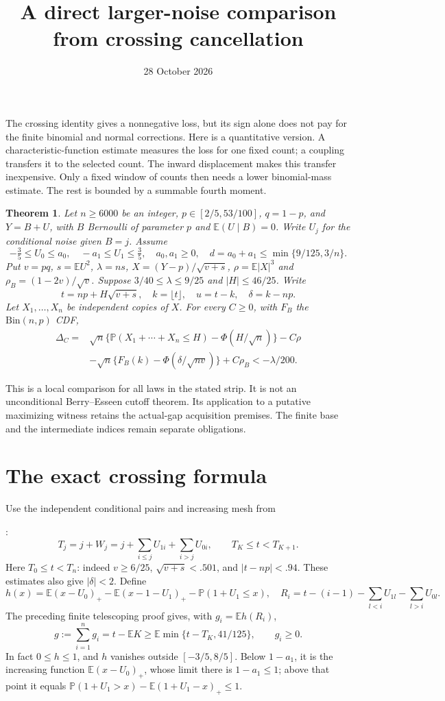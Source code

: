 \documentclass[11pt]{article}
\title{A direct larger-noise comparison from crossing cancellation}
\author{}\date{28 October 2026}
\newtheorem{theorem}{Theorem}\newtheorem{lemma}[theorem]{Lemma}
\newcommand{\E}{\mathbb E}\newcommand{\Pp}{\mathbb P}
\begin{document}
\maketitle

The crossing identity gives a nonnegative loss, but its sign alone does not
pay for the finite binomial and normal corrections. Here is a quantitative
version. A characteristic-function estimate measures the loss for one fixed
count; a coupling transfers it to the selected count. The inward displacement
makes this transfer inexpensive. Only a fixed window of counts then needs a
lower binomial-mass estimate. The rest is bounded by a summable fourth moment.

\begin{theorem}\label{thm:main}
Let $n\ge6000$ be an integer, $p\in[2/5,53/100]$, $q=1-p$, and
$Y=B+U$, with $B$ Bernoulli of parameter $p$ and $\E(U\mid B)=0$.
Write $U_j$ for the conditional noise given $B=j$.
Assume
\[
 -\tfrac35\le U_0\le a_0,\quad -a_1\le U_1\le\tfrac35,
 \quad a_0,a_1\ge0,\quad d=a_0+a_1\le\min\{9/125,3/n\}.
\]
Put $v=pq$, $s=\E U^2$, $\lambda=ns$, $X=(Y-p)/\sqrt{v+s}$,
$\rho=\E|X|^3$ and $\rho_B=(1-2v)/\sqrt v$. Suppose
$3/40\le\lambda\le9/25$ and $|H|\le46/25$. Write
\[
 t=np+H\sqrt{v+s},\quad k=\lfloor t\rfloor,\quad u=t-k,
 \quad\delta=k-np.
\]
Let $X_1,\ldots,X_n$ be independent copies of $X$.
For every $C\ge0$, with $F_B$ the $\mathrm{Bin}(n,p)$ CDF,
\begin{align*}
 \Delta_C={}&\sqrt n\{\Pp(X_1+\cdots+X_n\le H)-\Phi(H/\sqrt n)\}-C\rho\\
 &-\sqrt n\{F_B(k)-\Phi(\delta/\sqrt{nv})\}+C\rho_B
                         <-\lambda/200.
\end{align*}
\end{theorem}

This is a local comparison for all laws in the stated strip. It is not an
unconditional Berry--Esseen cutoff theorem. Its application to a putative
maximizing witness retains the actual-gap acquisition premises. The finite
base and the intermediate indices remain separate obligations.

\section{The exact crossing formula}
Use the independent conditional pairs and increasing mesh from\par\noindent
{}:
\[
 T_j=j+W_j=j+\sum_{i\le j}U_{1i}+\sum_{i>j}U_{0i},
 \qquad T_K\le t<T_{K+1}.
\]
Here $T_0\le t<T_n$: indeed $v\ge6/25$, $\sqrt{v+s}<.501$, and
$|t-np|<.94$. These estimates also give $|\delta|<2$.
Define
\[
 h(x)=\E(x-U_0)_+-\E(x-1-U_1)_+-\Pp(1+U_1\le x),
 \quad R_i=t-(i-1)-\sum_{l<i}U_{1l}-\sum_{l>i}U_{0l}.
\]
The preceding finite telescoping proof gives, with $g_i=\E h(R_i)$,
\begin{equation}\label{eq:age}
 g:=\sum_{i=1}^n g_i=t-\E K
       \ge\E\min\{t-T_K,41/125\},\qquad g_i\ge0.
\end{equation}
In fact $0\le h\le1$, and $h$ vanishes outside $[-3/5,8/5]$.
Below $1-a_1$, it is the increasing function $\E(x-U_0)_+$, whose
limit there is $1-a_1\le1$; above that point it equals
$\Pp(1+U_1>x)-\E(1+U_1-x)_+\le1$.
\end{document}
